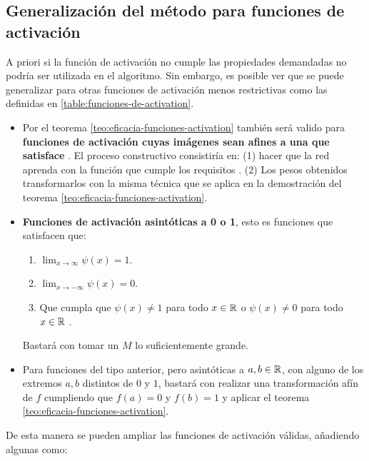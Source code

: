 \subsection{Generalización del método para funciones de activación }

A priori si  la función de activación no cumple las propiedades 
demandadas no podría ser utilizada en el algoritmo.  Sin embargo, es 
posible ver que se puede generalizar para otras
funciones de activación menos restrictivas como las definidas en \ref{table:funciones-de-activation}. 

\begin{itemize}
    \item Por el teorema \ref{teo:eficacia-funciones-activation} también será valido para 
    \textbf{funciones de activación cuyas imágenes sean
     afines a una que satisface }. 
     El proceso constructivo consistiría en: 
     (1) hacer que la red aprenda con la función que cumple los requisitos .
      (2) Los pesos obtenidos transformarlos con la misma técnica 
      que se aplica en la demostración del teorema \ref{teo:eficacia-funciones-activation}. 
    
    \item  \textbf{Funciones de activación asintóticas a 0 o 1}, esto es funciones que satisfacen que: 
    \begin{enumerate}
        \item $\lim _{x \rightarrow \infty} \psi(x) = 1
        $.
        \item $\lim _{x \rightarrow -\infty} \psi(x) = 0$.
        \item Que cumpla que $\psi(x) \neq 1$ para todo  $x\in \mathbb{R}$  o $\psi(x) \neq 0$ para todo $x\in \mathbb{R}$ .
    \end{enumerate}
    Bastará con tomar un $M$ lo suficientemente grande. 
    \item Para funciones del tipo anterior, pero asintóticas a $a,b \in \mathbb{R}$, con alguno de los extremos $a,b$ distintos de $0$ y $1$, bastará con realizar una transformación afín de $f$ cumpliendo que $f(a)= 0$ y $f(b)= 1$ y aplicar el teorema \ref{teo:eficacia-funciones-activation}. 
\end{itemize}

De esta manera se pueden ampliar las funciones de activación válidas, añadiendo algunas como: 

